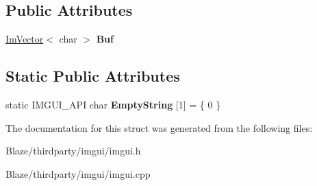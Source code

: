 \subsection*{Public Attributes}
\begin{DoxyCompactItemize}
\item 
\mbox{\label{structImGuiTextBuffer_aa6de034b1920cdae5505cc58abf14240}} 
\hyperlink{structImVector}{Im\+Vector}$<$ char $>$ {\bfseries Buf}
\end{DoxyCompactItemize}
\subsection*{Static Public Attributes}
\begin{DoxyCompactItemize}
\item 
\mbox{\label{structImGuiTextBuffer_a471f810a368ec5f4a8ee12c407330c35}} 
static I\+M\+G\+U\+I\+\_\+\+A\+PI char {\bfseries Empty\+String} \mbox{[}1\mbox{]} = \{ 0 \}
\end{DoxyCompactItemize}


The documentation for this struct was generated from the following files\+:\begin{DoxyCompactItemize}
\item 
Blaze/thirdparty/imgui/imgui.\+h\item 
Blaze/thirdparty/imgui/imgui.\+cpp\end{DoxyCompactItemize}
